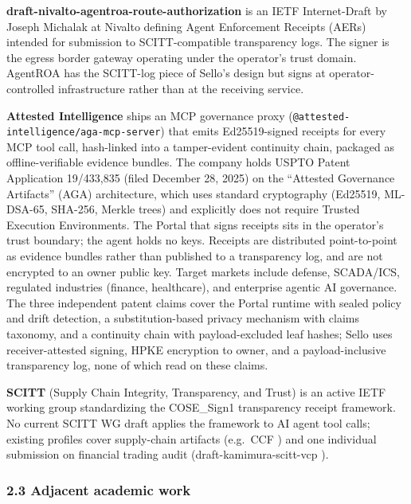 \documentclass[
  11pt,
]{article}
\begin{document}
\textbf{draft-nivalto-agentroa-route-authorization}
\citep{nivalto-agentroa} is an IETF Internet-Draft by Joseph Michalak at
Nivalto defining Agent Enforcement Receipts (AERs) intended for
submission to SCITT-compatible transparency logs. The signer is the
egress border gateway operating under the operator's trust domain.
AgentROA has the SCITT-log piece of Sello's design but signs at
operator-controlled infrastructure rather than at the receiving service.

\textbf{Attested Intelligence} \citep{attestedintelligence} ships an MCP
governance proxy (\texttt{@attested-intelligence/aga-mcp-server}) that
emits Ed25519-signed receipts for every MCP tool call, hash-linked into
a tamper-evident continuity chain, packaged as offline-verifiable
evidence bundles. The company holds USPTO Patent Application 19/433,835
(filed December 28, 2025) on the ``Attested Governance Artifacts'' (AGA)
architecture, which uses standard cryptography (Ed25519, ML-DSA-65,
SHA-256, Merkle trees) and explicitly does not require Trusted Execution
Environments. The Portal that signs receipts sits in the operator's
trust boundary; the agent holds no keys. Receipts are distributed
point-to-point as evidence bundles rather than published to a
transparency log, and are not encrypted to an owner public key. Target
markets include defense, SCADA/ICS, regulated industries (finance,
healthcare), and enterprise agentic AI governance. The three independent
patent claims cover the Portal runtime with sealed policy and drift
detection, a substitution-based privacy mechanism with claims taxonomy,
and a continuity chain with payload-excluded leaf hashes; Sello uses
receiver-attested signing, HPKE encryption to owner, and a
payload-inclusive transparency log, none of which read on these claims.

\textbf{SCITT} (Supply Chain Integrity, Transparency, and Trust) is an
active IETF working group \citep{scitt-architecture, scitt-scrapi}
standardizing the COSE\_Sign1 transparency receipt framework. No current
SCITT WG draft applies the framework to AI agent tool calls; existing
profiles cover supply-chain artifacts (e.g.~CCF \citep{scitt-ccf}) and
one individual submission on financial trading audit
(draft-kamimura-scitt-vcp \citep{kamimura-scitt}).

\hypertarget{adjacent-academic-work}{%
\subsubsection{2.3 Adjacent academic
work}\label{adjacent-academic-work}}
\end{document}
